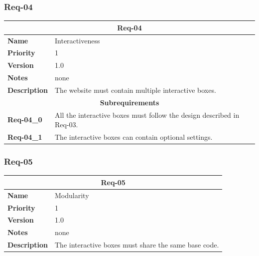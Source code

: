 \documentclass{article}
\begin{document}
\subsubsection{Req-04}

\bgroup{}
\def\arraystretch{1.25}
\begin{center}
    \begin{tabular}{ |l|p{9cm}| }
        \hline
        \multicolumn{2}{|c|}{\textbf{Req-04}} \\
        \hline
        \textbf{Name} & Interactiveness \\
        \hline
        \textbf{Priority} & 1 \\
        \hline
        \textbf{Version} & 1.0 \\
        \hline
        \textbf{Notes} & none \\
        \hline
        \textbf{Description}
        & The website must contain multiple interactive boxes. \\
        \hline
        \multicolumn{2}{|c|}{\textbf{Subrequirements}} \\
        \hline
        \textbf{Req-04\_0} & All the interactive boxes must follow the design described in Req-03. \\
        \hline
        \textbf{Req-04\_1} & The interactive boxes can contain optional settings.\\
        \hline
    \end{tabular}
\end{center}
\egroup{}

\subsubsection{Req-05}

\bgroup{}
\def\arraystretch{1.25}
\begin{center}
    \begin{tabular}{ |l|p{9cm}| }
        \hline
        \multicolumn{2}{|c|}{\textbf{Req-05}} \\
        \hline
        \textbf{Name} & Modularity \\
        \hline
        \textbf{Priority} & 1 \\
        \hline
        \textbf{Version} & 1.0 \\
        \hline
        \textbf{Notes} & none \\
        \hline
        \textbf{Description}
        & The interactive boxes must share the same base code. \\
        \hline
    \end{tabular}
\end{center}
\egroup{}
\end{document}
